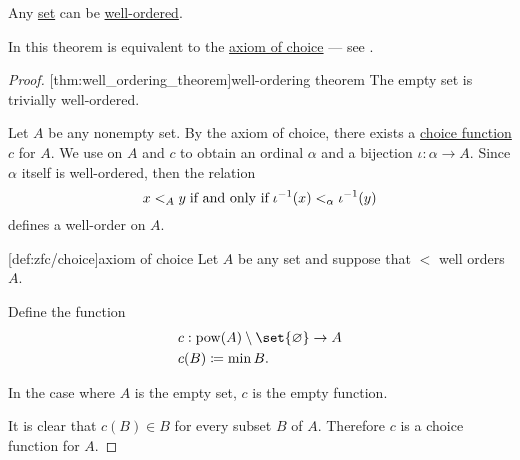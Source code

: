 \begin{theorem}\label{thm:well_ordering_theorem}
  Any \hyperref[def:set]{set} can be \hyperref[def:well_ordered_set]{well-ordered}.

  In \hyperref[def:zfc]{} this theorem is equivalent to the \hyperref[def:zfc/choice]{axiom of choice} --- see .
\end{theorem}
\begin{proof}
  [thm:well_ordering_theorem]{well-ordering theorem} The empty set is trivially well-ordered.

  Let \( A \) be any nonempty set. By the axiom of choice, there exists a \hyperref[def:choice_function]{choice function} \( c \) for \( A \). We use  on \( A \) and \( c \) to obtain an ordinal \( \alpha \) and a bijection \( \iota: \alpha \to A \). Since \( \alpha \) itself is well-ordered, then the relation
  \begin{equation*}
    x <_A y \T{if and only if} \iota^{-1}(x) <_\alpha \iota^{-1}(y)
  \end{equation*}
  defines a well-order on \( A \).

  [def:zfc/choice]{axiom of choice} Let \( A \) be any set and suppose that \( < \) well orders \( A \).

  Define the function
  \begin{equation*}
    \begin{aligned}
      &c: \pow(A) \setminus \set{ \varnothing } \to A \\
      &c(B) \coloneqq \min B.
    \end{aligned}
  \end{equation*}

  In the case where \( A \) is the empty set, \( c \) is the empty function.

  It is clear that \( c(B) \in B \) for every subset \( B \) of \( A \). Therefore \( c \) is a choice function for \( A \).
\end{proof}

